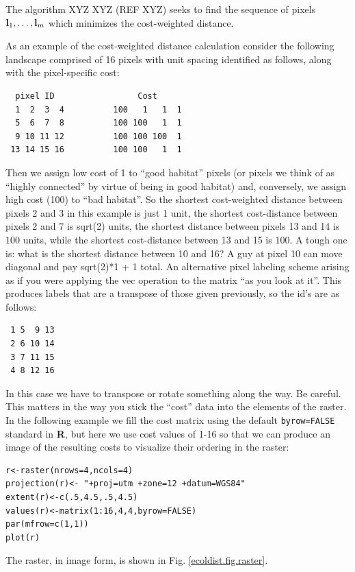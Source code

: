 The algorithm XYZ XYZ (REF XYZ) seeks to find the  sequence of pixels ${\bf l}_{1},
\ldots, {\bf l}_{m}$ which minimizes the cost-weighted distance. 


As an example of the cost-weighted distance calculation consider the
following landscape comprised of 16 pixels with unit spacing 
identified as follows, along
with the pixel-specific cost:
\begin{verbatim}
  pixel ID                 Cost
  1  2  3  4          100   1   1  1
  5  6  7  8          100 100   1  1
  9 10 11 12          100 100 100  1
 13 14 15 16          100 100   1  1 
\end{verbatim}
Then we assign low cost of 1 to ``good habitat'' pixels (or pixels we
think of as ``highly connected'' by virtue of being in good habitat)
and, conversely, we assign high cost (100) to ``bad habitat''. So the
shortest cost-weighted distance between pixels 2 and 3 in this example
is just 1 unit, the shortest cost-distance between pixels 2 and 7 is
sqrt(2) units, the shortest distance between pixels 13 and 14 is 100
units, while the shortest cost-distance between 13 and 15 is 100. A
tough one is: what is the shortest distance between 10 and 16? A guy at pixel
10 can move diagonal and pay sqrt(2)*1 + 1 total.
An alternative pixel labeling scheme arising as if you were applying
the vec operation to the matrix ``as you look at it''. This produces
labels that are a transpose of those given previously, so the id's are
as follows:
\begin{verbatim}
 1 5  9 13
 2 6 10 14
 3 7 11 15
 4 8 12 16
\end{verbatim}
In this case we have to transpose or rotate something along the way. 
Be careful. This matters in the way you stick the ``cost'' data into
the elements of the raster.
In the following example we fill the cost
matrix using the default \mbox{\tt byrow=FALSE} standard in {\bf
  R}, but here we use cost values of 1-16 so that we can produce an
image of the resulting costs to visualize their ordering in the raster:
\begin{verbatim}
r<-raster(nrows=4,ncols=4)
projection(r)<- "+proj=utm +zone=12 +datum=WGS84"
extent(r)<-c(.5,4.5,.5,4.5)
values(r)<-matrix(1:16,4,4,byrow=FALSE)
par(mfrow=c(1,1))
plot(r)
\end{verbatim}
The raster, in image form, is shown in Fig. \ref{ecoldist.fig.raster}.


